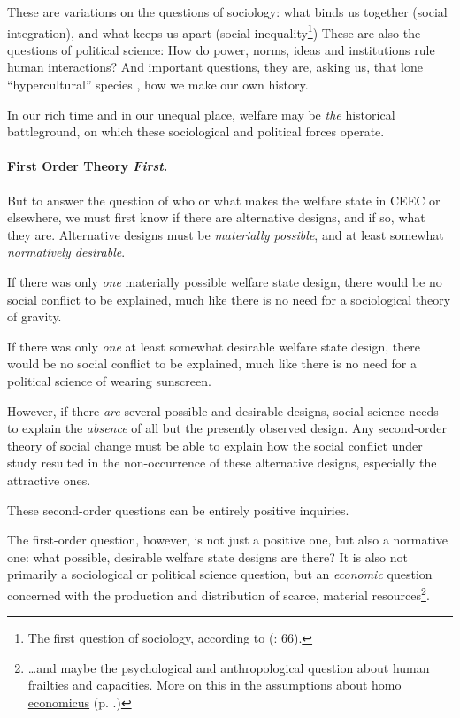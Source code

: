 \documentclass[11pt,a4paper,oneside,openright]{article}
\begin{document}
These are variations on the questions of sociology: what binds us together (social integration), and what keeps us apart (social inequality\footnote{
	The first question of sociology, according to \citeauthor{Dahrendorf1966} (\citeyear{Dahrendorf1966}: 66).}) 
These are also the questions of political science: How do power, norms, ideas and institutions rule human interactions? And important questions, they are, asking us, that lone ``hypercultural'' species \citep{Henrich2004}, how we make our own history. 

In our rich time and in our unequal place, welfare may be \emph{the} historical battleground, on which these sociological and political forces operate. 

\paragraph{First Order Theory \emph{First}.}
But to answer the question of who or what makes the welfare state in \gls{CEEC} or elsewhere, we must first know if there are alternative designs, and if so, what they are. Alternative designs must be \emph{materially possible}, and at least somewhat \emph{normatively desirable}.

If there was only \emph{one} materially possible welfare state design, there would be no social conflict to be explained, much like there is no need for a sociological theory of gravity. 

If there was only \emph{one} at least somewhat desirable welfare state design, there would be no social conflict to be explained, much like there is no need for a political science of wearing sunscreen.

However, if there \emph{are} several possible and desirable designs, social science needs to explain the \emph{absence} of all but the presently observed design. Any second-order theory of social change must be able to explain how the social conflict under study resulted in the non-occurrence of these alternative designs, especially the attractive ones. 

These second-order questions can be entirely positive inquiries.

The first-order question, however, is not just a positive one, but also a normative one: what possible, desirable welfare state designs are there? It is also not primarily a sociological or political science question, but an \emph{economic} question concerned with the production and distribution of scarce, material resources\footnote
	{\ldots and maybe the psychological and anthropological question about human frailties and capacities. More on this in the assumptions about \hyperref[it:homo_economicus]{homo economicus} (p. \pageref{it:homo_economicus}.)}.
\end{document}
